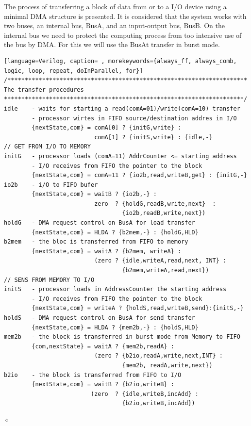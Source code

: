 \begin{exemplu}\label{minDMA}
The process of transferring a block of data from or to a I/O device using a minimal DMA structure is presented. It is considered that the system works with two buses, an internal bus, BusA, and an input-output bus, BusB. On the internal bus we need to protect the computing process from too intensive use of the bus by DMA. For this we will use the BusAt transfer in burst mode. 

{\em 
{}
}

{\em
{\small
\begin{shaded*}
\begin{lstlisting}[language=Verilog, caption= , morekeywords={always_ff, always_comb, logic, loop, repeat, doInParallel, for}]
/*********************************************************************
The transfer procedures 
*********************************************************************/
idle    - waits for starting a read(comA=01)/write(comA=10) transfer
        - processor wirtes in FIFO source/destination addres in I/O
        {nextState,com} = comA[0] ? {initG,write} : 
                          comA[1] ? {initS,write} : {idle,-} 
// GET FROM I/O TO MEMORY
initG   - processor loads (comA=11) AddrCounter <= starting address 
        - I/O receives from FIFO the pointer to the block
        {nextState,com} = comA=11 ? {io2b,read,writeB,get} : {initG,-}
io2b    - i/O to FIFO bufer
        {nextState,com} = waitB ? {io2b,-} :             
                          zero  ? {holdG,readB,write,next}  :
                                  {io2b,readB,write,next})                      
holdG   - DMA request control on BusA for load transfer
        {nextState,com} = HLDA ? {b2mem,-} : {holdG,HLD}
b2mem   - the bloc is transferred from FIFO to memory
        {nextState,com} = waitA ? {b2mem, writeA} :
                          (zero ? {idle,writeA,read,next, INT} :
                                  {b2mem,writeA,read,next})
// SENS FROM MEMORY TO I/O
initS   - processor loads in AddressCounter the starting address 
        - I/O receives from FIFO the pointer to the block
        {nextState,com} = writeA ? {holdS,read,writeB,send}:{initS,-}
holdS   - DMA request control on BusA for send transfer
        {nextState,com} = HLDA ? {mem2b,-} : {holdS,HLD}
mem2b   - the block is transferred in burst mode from Memory to FIFO
        {com,nextState} = waitA ? {mem2b,readA} :
                          (zero ? {b2io,readA,write,next,INT} :
                                  {mem2b, readA,write,next})
b2io    - the block is transferred from FIFO to I/O
        {nextState,com} = waitB ? {b2io,writeB} :
                         (zero  ? {idle,writeB,incAdd} :
                                  {b2io,writeB,incAdd})
\end{lstlisting}
\end{shaded*}
}}

$\diamond$
\end{exemplu}
